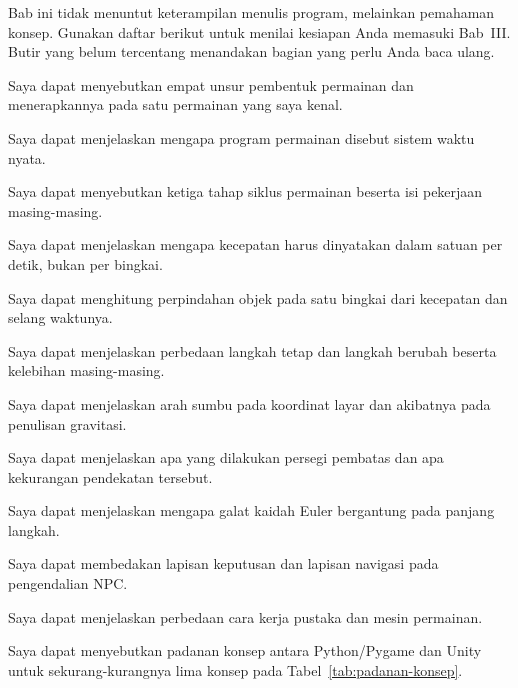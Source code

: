 
Bab ini tidak menuntut keterampilan menulis program, melainkan pemahaman
konsep. Gunakan daftar berikut untuk menilai kesiapan Anda memasuki Bab~III.
Butir yang belum tercentang menandakan bagian yang perlu Anda baca ulang.

\begin{checklistbox}
\begin{checklist}
  \item Saya dapat menyebutkan empat unsur pembentuk permainan dan
        menerapkannya pada satu permainan yang saya kenal.
  \item Saya dapat menjelaskan mengapa program permainan disebut sistem waktu
        nyata.
  \item Saya dapat menyebutkan ketiga tahap siklus permainan beserta isi
        pekerjaan masing-masing.
  \item Saya dapat menjelaskan mengapa kecepatan harus dinyatakan dalam satuan
        per detik, bukan per bingkai.
  \item Saya dapat menghitung perpindahan objek pada satu bingkai dari
        kecepatan dan selang waktunya.
  \item Saya dapat menjelaskan perbedaan langkah tetap dan langkah berubah
        beserta kelebihan masing-masing.
  \item Saya dapat menjelaskan arah sumbu pada koordinat layar dan akibatnya
        pada penulisan gravitasi.
  \item Saya dapat menjelaskan apa yang dilakukan persegi pembatas dan apa
        kekurangan pendekatan tersebut.
  \item Saya dapat menjelaskan mengapa galat kaidah Euler bergantung pada
        panjang langkah.
  \item Saya dapat membedakan lapisan keputusan dan lapisan navigasi pada
        pengendalian NPC.
  \item Saya dapat menjelaskan perbedaan cara kerja pustaka dan mesin
        permainan.
  \item Saya dapat menyebutkan padanan konsep antara Python/Pygame dan Unity
        untuk sekurang-kurangnya lima konsep pada
        Tabel~\ref{tab:padanan-konsep}.
\end{checklist}
\end{checklistbox}
